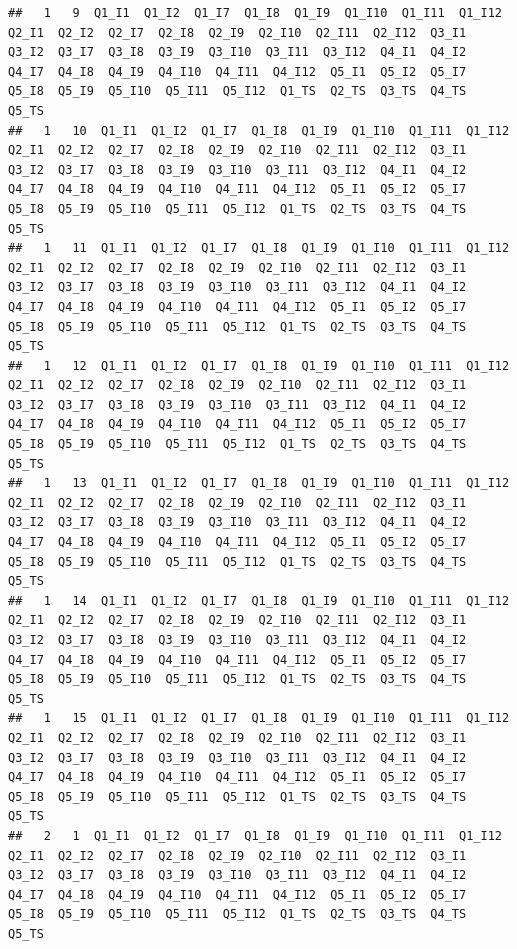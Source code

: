 \documentclass[
]{book}
\begin{document}
\begin{verbatim}
##   1   9  Q1_I1  Q1_I2  Q1_I7  Q1_I8  Q1_I9  Q1_I10  Q1_I11  Q1_I12  Q2_I1  Q2_I2  Q2_I7  Q2_I8  Q2_I9  Q2_I10  Q2_I11  Q2_I12  Q3_I1  Q3_I2  Q3_I7  Q3_I8  Q3_I9  Q3_I10  Q3_I11  Q3_I12  Q4_I1  Q4_I2  Q4_I7  Q4_I8  Q4_I9  Q4_I10  Q4_I11  Q4_I12  Q5_I1  Q5_I2  Q5_I7  Q5_I8  Q5_I9  Q5_I10  Q5_I11  Q5_I12  Q1_TS  Q2_TS  Q3_TS  Q4_TS  Q5_TS
##   1   10  Q1_I1  Q1_I2  Q1_I7  Q1_I8  Q1_I9  Q1_I10  Q1_I11  Q1_I12  Q2_I1  Q2_I2  Q2_I7  Q2_I8  Q2_I9  Q2_I10  Q2_I11  Q2_I12  Q3_I1  Q3_I2  Q3_I7  Q3_I8  Q3_I9  Q3_I10  Q3_I11  Q3_I12  Q4_I1  Q4_I2  Q4_I7  Q4_I8  Q4_I9  Q4_I10  Q4_I11  Q4_I12  Q5_I1  Q5_I2  Q5_I7  Q5_I8  Q5_I9  Q5_I10  Q5_I11  Q5_I12  Q1_TS  Q2_TS  Q3_TS  Q4_TS  Q5_TS
##   1   11  Q1_I1  Q1_I2  Q1_I7  Q1_I8  Q1_I9  Q1_I10  Q1_I11  Q1_I12  Q2_I1  Q2_I2  Q2_I7  Q2_I8  Q2_I9  Q2_I10  Q2_I11  Q2_I12  Q3_I1  Q3_I2  Q3_I7  Q3_I8  Q3_I9  Q3_I10  Q3_I11  Q3_I12  Q4_I1  Q4_I2  Q4_I7  Q4_I8  Q4_I9  Q4_I10  Q4_I11  Q4_I12  Q5_I1  Q5_I2  Q5_I7  Q5_I8  Q5_I9  Q5_I10  Q5_I11  Q5_I12  Q1_TS  Q2_TS  Q3_TS  Q4_TS  Q5_TS
##   1   12  Q1_I1  Q1_I2  Q1_I7  Q1_I8  Q1_I9  Q1_I10  Q1_I11  Q1_I12  Q2_I1  Q2_I2  Q2_I7  Q2_I8  Q2_I9  Q2_I10  Q2_I11  Q2_I12  Q3_I1  Q3_I2  Q3_I7  Q3_I8  Q3_I9  Q3_I10  Q3_I11  Q3_I12  Q4_I1  Q4_I2  Q4_I7  Q4_I8  Q4_I9  Q4_I10  Q4_I11  Q4_I12  Q5_I1  Q5_I2  Q5_I7  Q5_I8  Q5_I9  Q5_I10  Q5_I11  Q5_I12  Q1_TS  Q2_TS  Q3_TS  Q4_TS  Q5_TS
##   1   13  Q1_I1  Q1_I2  Q1_I7  Q1_I8  Q1_I9  Q1_I10  Q1_I11  Q1_I12  Q2_I1  Q2_I2  Q2_I7  Q2_I8  Q2_I9  Q2_I10  Q2_I11  Q2_I12  Q3_I1  Q3_I2  Q3_I7  Q3_I8  Q3_I9  Q3_I10  Q3_I11  Q3_I12  Q4_I1  Q4_I2  Q4_I7  Q4_I8  Q4_I9  Q4_I10  Q4_I11  Q4_I12  Q5_I1  Q5_I2  Q5_I7  Q5_I8  Q5_I9  Q5_I10  Q5_I11  Q5_I12  Q1_TS  Q2_TS  Q3_TS  Q4_TS  Q5_TS
##   1   14  Q1_I1  Q1_I2  Q1_I7  Q1_I8  Q1_I9  Q1_I10  Q1_I11  Q1_I12  Q2_I1  Q2_I2  Q2_I7  Q2_I8  Q2_I9  Q2_I10  Q2_I11  Q2_I12  Q3_I1  Q3_I2  Q3_I7  Q3_I8  Q3_I9  Q3_I10  Q3_I11  Q3_I12  Q4_I1  Q4_I2  Q4_I7  Q4_I8  Q4_I9  Q4_I10  Q4_I11  Q4_I12  Q5_I1  Q5_I2  Q5_I7  Q5_I8  Q5_I9  Q5_I10  Q5_I11  Q5_I12  Q1_TS  Q2_TS  Q3_TS  Q4_TS  Q5_TS
##   1   15  Q1_I1  Q1_I2  Q1_I7  Q1_I8  Q1_I9  Q1_I10  Q1_I11  Q1_I12  Q2_I1  Q2_I2  Q2_I7  Q2_I8  Q2_I9  Q2_I10  Q2_I11  Q2_I12  Q3_I1  Q3_I2  Q3_I7  Q3_I8  Q3_I9  Q3_I10  Q3_I11  Q3_I12  Q4_I1  Q4_I2  Q4_I7  Q4_I8  Q4_I9  Q4_I10  Q4_I11  Q4_I12  Q5_I1  Q5_I2  Q5_I7  Q5_I8  Q5_I9  Q5_I10  Q5_I11  Q5_I12  Q1_TS  Q2_TS  Q3_TS  Q4_TS  Q5_TS
##   2   1  Q1_I1  Q1_I2  Q1_I7  Q1_I8  Q1_I9  Q1_I10  Q1_I11  Q1_I12  Q2_I1  Q2_I2  Q2_I7  Q2_I8  Q2_I9  Q2_I10  Q2_I11  Q2_I12  Q3_I1  Q3_I2  Q3_I7  Q3_I8  Q3_I9  Q3_I10  Q3_I11  Q3_I12  Q4_I1  Q4_I2  Q4_I7  Q4_I8  Q4_I9  Q4_I10  Q4_I11  Q4_I12  Q5_I1  Q5_I2  Q5_I7  Q5_I8  Q5_I9  Q5_I10  Q5_I11  Q5_I12  Q1_TS  Q2_TS  Q3_TS  Q4_TS  Q5_TS

\end{verbatim}
\end{document}

